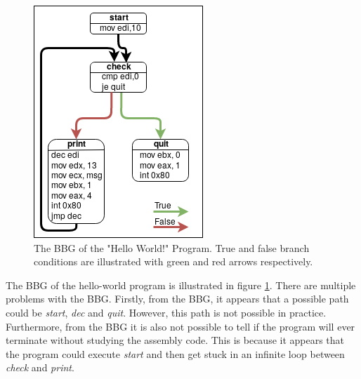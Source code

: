 \documentclass{kththesis}
\renewcommand{\it}[1]{\textit{#1}}
\begin{document}
\begin{figure}[ht]
    \centering
    \includegraphics[scale=0.6]{Images/CFGExample.png}
    \caption{The BBG of the "Hello World!" Program. True and false branch conditions are illustrated with green and red arrows respectively.}
    \label{fig:HelloBBG}
\end{figure}
\clearpage
\noindent
The BBG of the hello-world program is illustrated in figure \ref{fig:HelloBBG}. There are multiple problems with the BBG. Firstly, from the BBG, it appears that a possible path could be \it{start}, \it{dec} and \it{quit}. However, this path is not possible in practice. Furthermore, from the BBG it is also not possible to tell if the program will ever terminate without studying the assembly code. This is because it appears that the program could execute \it{start} and then get stuck in an infinite loop between \it{check} and \it{print}.
\end{document}
